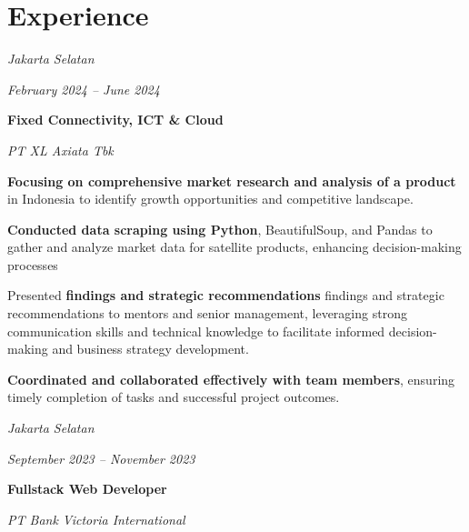 \documentclass[../main.tex]{subfiles}
\begin{document}
    \section{Experience}
        \begin{twocolentry}{
            \small
        \textit{Jakarta Selatan}    
            
          \textit{February 2024 – June 2024}}
      \textbf{Fixed Connectivity, ICT \& Cloud}
            
            \textit{PT XL Axiata Tbk}
        \end{twocolentry}

        \vspace{0.10 cm}
        \begin{onecolentry}
            \begin{highlights}
            \item \textbf{Focusing on comprehensive market research and analysis of a product} in Indonesia to identify growth opportunities and competitive landscape.
            \item \textbf{Conducted data scraping using Python}, BeautifulSoup, and Pandas to gather and analyze market data for satellite products, enhancing decision-making processes
            \item Presented \textbf{findings and strategic recommendations} findings and strategic recommendations to mentors and senior management, leveraging strong communication skills and technical knowledge to facilitate informed decision-making and business strategy development.
            \item \textbf{Coordinated and collaborated effectively with team members}, ensuring timely completion of tasks and successful project outcomes.
            \end{highlights}
        \end{onecolentry}


        \vspace{0.2 cm}

        \begin{twocolentry}{
        \small

        \textit{Jakarta Selatan}    
            
        \textit{September 2023 – November 2023}}
            \textbf{Fullstack Web Developer}
            
            \textit{PT Bank Victoria International}
        \end{twocolentry}
\end{document}
